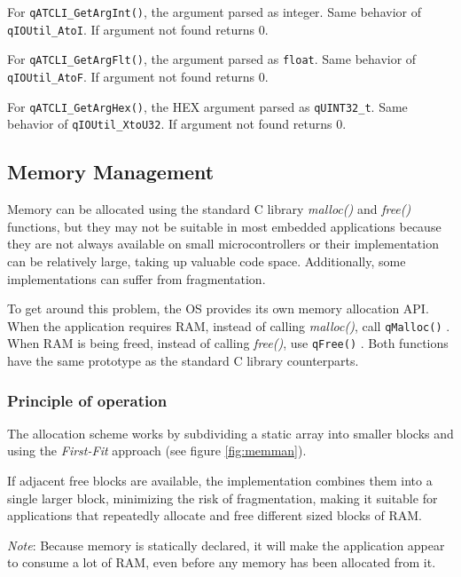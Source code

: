 For \lstinline{qATCLI_GetArgInt()}, the argument parsed as integer. Same behavior of \lstinline{qIOUtil_AtoI}. If argument not found returns 0.

For \lstinline{qATCLI_GetArgFlt()}, the argument parsed as \lstinline{float}. Same behavior of \lstinline{qIOUtil_AtoF}. If argument not found returns 0.

For \lstinline{qATCLI_GetArgHex()}, the HEX argument parsed as \lstinline{qUINT32_t}. Same behavior of \lstinline{qIOUtil_XtoU32}. If argument not found returns 0.

\subsection{Memory Management} \label{memmanagement}
Memory can be allocated using the standard C library \textit{malloc()} and \textit{free()} functions, but they may not be suitable in most embedded applications because they are not always available on small microcontrollers or their implementation can be relatively large, taking up valuable code space. Additionally, some implementations can suffer from fragmentation.

To get around this problem, the OS  provides its own memory allocation API. When the application requires RAM, instead of calling \textit{malloc()},  call \lstinline{qMalloc()} . When RAM is being freed, instead of calling \textit{free()}, use \lstinline{qFree()} . Both functions have the same prototype as the standard C library counterparts.

\subsubsection{Principle of operation}
The allocation scheme works by subdividing a static array into smaller blocks and using the \textit{First-Fit} approach (see figure \ref{fig:memman}). 

If adjacent free blocks are available, the implementation combines them into a single larger block, minimizing the risk of fragmentation, making it suitable for applications that repeatedly allocate and free different sized blocks of RAM.



\begin{tcolorbox}
\ArrowBoldDownRight \textit{Note}: Because memory is statically declared, it will make the application appear to consume a lot of RAM, even before any memory has been allocated from it.
\end{tcolorbox}

